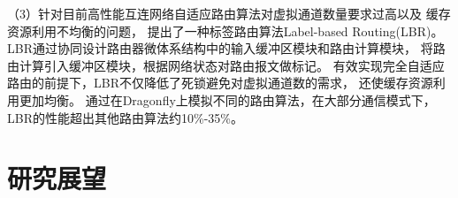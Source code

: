   （3）针对目前高性能互连网络自适应路由算法对虚拟通道数量要求过高以及
  缓存资源利用不均衡的问题，
  提出了一种标签路由算法Label-based Routing(LBR)。
  LBR通过协同设计路由器微体系结构中的输入缓冲区模块和路由计算模块，
  将路由计算引入缓冲区模块，根据网络状态对路由报文做标记。
  有效实现完全自适应路由的前提下，LBR不仅降低了死锁避免对虚拟通道数的需求，
  还使缓存资源利用更加均衡。
  通过在Dragonfly上模拟不同的路由算法，在大部分通信模式下，
  LBR的性能超出其他路由算法约10\%-35\%。



\section{研究展望}

